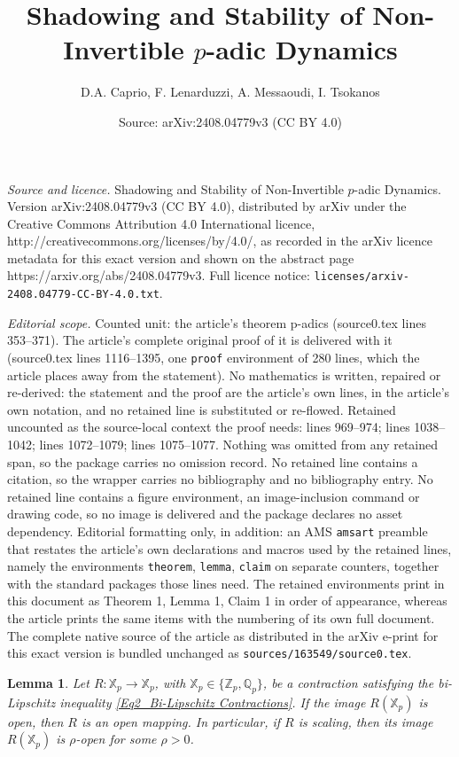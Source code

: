 \documentclass[10pt,a4paper]{amsart}
\title{Shadowing and Stability of Non-Invertible $p$-adic Dynamics}
\author{D.A. Caprio, F. Lenarduzzi, A. Messaoudi, I. Tsokanos}
\date{Source: arXiv:2408.04779v3 (CC BY 4.0)}
\newtheorem{lemma}{Lemma}
\begin{document}
\maketitle

\noindent\emph{Source and licence.} Shadowing and Stability of Non-Invertible $p$-adic Dynamics. Version arXiv:2408.04779v3 (CC BY 4.0), distributed by arXiv under the Creative Commons Attribution 4.0 International licence, http://creativecommons.org/licenses/by/4.0/, as recorded in the arXiv licence metadata for this exact version and shown on the abstract page https://arxiv.org/abs/2408.04779v3. Full licence notice: \texttt{licenses/arxiv-2408.04779-CC-BY-4.0.txt}.\par\smallskip

\noindent\textit{Editorial scope.} Counted unit: the article's theorem p-adics (source0.tex lines 353--371). The article's complete original proof of it is delivered with it (source0.tex lines 1116--1395, one \texttt{proof} environment of 280 lines, which the article places away from the statement). No mathematics is written, repaired or re-derived: the statement and the proof are the article's own lines, in the article's own notation, and no retained line is substituted or re-flowed.  Retained uncounted as the source-local context the proof needs: lines 969--974; lines 1038--1042; lines 1072--1079; lines 1075--1077.  Nothing was omitted from any retained span, so the package carries no omission record.  No retained line contains a citation, so the wrapper carries no bibliography and no bibliography entry.  No retained line contains a figure environment, an image-inclusion command or drawing code, so no image is delivered and the package declares no asset dependency.  Editorial formatting only, in addition: an AMS \texttt{amsart} preamble that restates the article's own declarations and macros used by the retained lines, namely the environments \texttt{theorem}, \texttt{lemma}, \texttt{claim} on separate counters, together with the standard packages those lines need.  The retained environments print in this document as Theorem 1, Lemma 1, Claim 1 in order of appearance, whereas the article prints the same items with the numbering of its own full document.  The complete native source of the article as distributed in the arXiv e-print for this exact version is bundled unchanged as \texttt{sources/163549/source0.tex}.
	\begin{lemma}\label{Lem2_Open bi-Lipschitz Contractions}
		Let $R: \mathbb{X}_{p} \to \mathbb{X}_{p}$, with $\mathbb{X}_{p} \in \{\mathbb{Z}_{p}, \mathbb{Q}_{p}\}$, be a contraction satisfying the bi-Lipschitz inequality \eqref{Eq2_Bi-Lipschitz Contractions}. 
		If the image $R(\mathbb{X}_{p})$ is open, then $R$ is an open mapping. 
		In particular, if $R$ is scaling, then its image $R(\mathbb{X}_{p})$ is $\rho$-open for some $\rho > 0$.
		
	\end{lemma}
\end{document}
